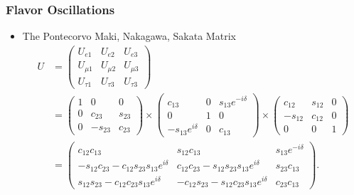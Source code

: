 \documentclass[mathserif,18pt,xcolor=table]{beamer}
\begin{document}
\begin{frame}
  \frametitle{Flavor Oscillations}
  \begin{itemize}
  \item The Pontecorvo Maki, Nakagawa, Sakata Matrix
\begin{align}
  U & =
  \begin{pmatrix}
    U_{e1}    & U_{e2}    & U_{e3}   \\
    U_{\mu1}  & U_{\mu2}  & U_{\mu3} \\
    U_{\tau1} & U_{\tau3} & U_{\tau3}
  \end{pmatrix} \\
  \label{eq:umatrix}
  & = \begin{pmatrix}
    1 & 0 & 0 \\
    0 & c_{23} & s_{23} \\
    0 & -s_{23} & c_{23} \end{pmatrix} \times
  \begin{pmatrix}
    c_{13} & 0 & s_{13}e^{-i\delta} \\
    0      & 1 & 0 \\
    -s_{13}e^{i\delta} & 0 & c_{13} \end{pmatrix} \times
  \begin{pmatrix}
    c_{12} & s_{12} & 0 \\
    -s_{12} & c_{12} & 0 \\
    0 & 0 & 1
  \end{pmatrix} \\
  & = \begin{pmatrix}
    c_{12}c_{13} & s_{12}c_{13} & s_{13}e^{-i\delta} \\
    -s_{12}c_{23} - c_{12}s_{23}s_{13}e^{i\delta} & c_{12}c_{23} - s_{12}s_{23}s_{13}e^{i\delta} & s_{23}c_{13} \\
    s_{12}s_{23} - c_{12}c_{23}s_{13}e^{i\delta} & -c_{12}s_{23} - s_{12}c_{23}s_{13}e^{i\delta} & c_{23}c_{13}
  \end{pmatrix}.
\end{align}
\end{itemize}
\end{frame}
\end{document}
